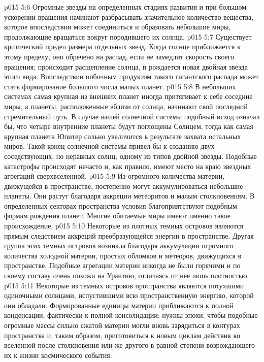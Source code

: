 \vs p015 5:6 \bibnobreakspace {} Огромные звезды на определенных стадиях развития и при большом ускорении вращения начинают разбрасывать значительное количество вещества, которое впоследствии может соединиться и образовать небольшие миры, продолжающие вращаться вокруг породившего их солнца.
\vs p015 5:7 \bibnobreakspace {} Существует критический предел размера отдельных звезд. Когда солнце приближается к этому пределу, оно обречено на распад, если не замедлит скорость своего вращения; происходит расщепление солнца, и рождается новая двойная звезда этого вида. Впоследствии побочным продуктом такого гигантского распада может стать формирование большого числа малых планет.
\vs p015 5:8 \bibnobreakspace {} В небольших системах самая крупная из внешних планет иногда притягивает к себе соседние миры, а планеты, расположенные вблизи от солнца, начинают свой последний стремительный путь. В случае вашей солнечной системы подобный исход означал бы, что четыре внутренние планеты будут поглощены Солнцем, тогда как самая крупная планета Юпитер сильно увеличится в результате захвата остальных миров. Такой конец солнечной системы привел бы к созданию двух соседствующих, но неравных солнц, одному из типов двойной звезды. Подобные катастрофы происходят нечасто и, как правило, имеют место на краю звездных агрегаций сверхвселенной.
\vs p015 5:9 \bibnobreakspace {} Из огромного количества материи, движущейся в пространстве, постепенно могут аккумулироваться небольшие планеты. Они растут благодаря аккреции метеоритов и малым столкновениям. В определенных секторах пространства условия благоприятствуют подобным формам рождения планет. Многие обитаемые миры имеют именно такое происхождение.
\vs p015 5:10 Некоторые из плотных темных островов являются прямым следствием аккреций преобразующейся энергии в пространстве. Другая группа этих темных островов возникла благодаря аккумуляции огромного количества холодной материи, простых обломков и метеоров, движущихся в пространстве. Подобные агрегации материи никогда не были горячими и по своему составу очень похожи на Урантию, отличаясь от нее лишь плотностью.
\vs p015 5:11 \bibnobreakspace {} Некоторые из темных островов пространства являются потухшими одиночными солнцами, испустившими всю пространственную энергию, которой они обладали. Формированные единицы материи приближаются к полной конденсации, фактически к полной консолидации; нужны эпохи, чтобы подобные огромные массы сильно сжатой материи могли вновь зарядиться в контурах пространства и, таким образом, приготовиться к новым циклам действия во вселенной после столкновения или же другого в равной степени возрождающего их к жизни космического события.
